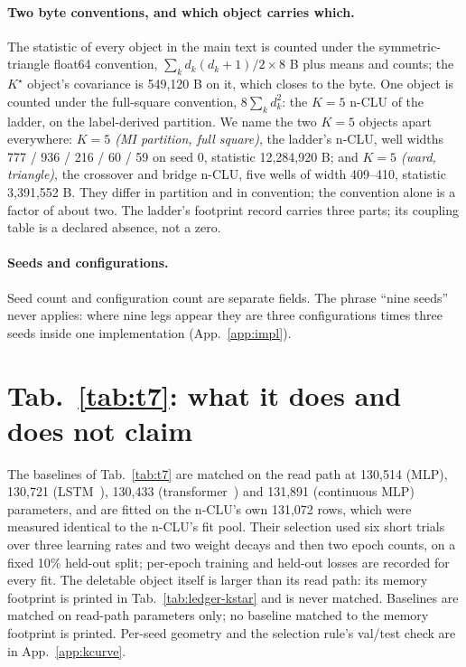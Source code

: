 \documentclass{article} %
\newcommand{\Kstar}{\ensuremath{K^{\star}}}
\begin{document}
\paragraph{Two byte conventions, and which object carries which.} The statistic of every object
in the main text is counted under the symmetric-triangle float64 convention,
$\sum_k d_k(d_k+1)/2\times8$ B plus means and counts; the $\Kstar$ object's covariance is
549,120 B on it, which closes to the byte. %
One object is counted under the full-square convention, $8\sum_k d_k^2$: the $K=5$ n-CLU of the
ladder, on the label-derived partition. We name the two $K=5$ objects apart everywhere:
\emph{$K=5$ (MI partition, full square)}, the ladder's n-CLU, well widths 777 / 936 / 216 / 60 /
59 on seed 0, statistic 12,284,920 B; and \emph{$K=5$ (ward, triangle)}, the crossover and
bridge n-CLU, five wells of width 409--410, statistic 3,391,552 B. They differ in partition and
in convention; the convention alone is a factor of about two.
The ladder's footprint record carries three parts; its coupling table is a declared absence, not a
zero. %

\paragraph{Seeds and configurations.} Seed count and configuration count are separate fields. The
phrase ``nine seeds'' never applies: where nine legs appear they are three configurations times
three seeds inside one implementation (App.~\ref{app:impl}).

\section{Tab.~\ref{tab:t7}: what it does and does not claim}
\label{app:t7more}
The baselines of Tab.~\ref{tab:t7} are matched on the read path at 130,514 (MLP), 130,721 (LSTM~\citep{hochreiter_long_1997}), %
130,433 (transformer~\citep{vaswani_attention_2023}) and 131,891 (continuous MLP) parameters, and are fitted on the n-CLU's own %
131,072 rows, which were measured identical to the n-CLU's fit pool. Their selection used six short %
trials over three learning rates and two weight decays and then two epoch counts, on a fixed 10\%
held-out split; per-epoch training and held-out losses are recorded for every fit. %
The deletable object itself is larger than its read path: its memory footprint is printed
in Tab.~\ref{tab:ledger-kstar} and is never matched. Baselines are matched on read-path
parameters only; no baseline matched to the memory footprint is printed.
Per-seed geometry and the selection rule's val/test check are in App.~\ref{app:kcurve}.
\end{document}
